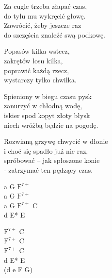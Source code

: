 \begin{text}
Za cugle trzeba złapać czas,\\
do tyłu mu wykręcić głowę.\\
Zawrócić, żeby jeszcze raz\\
do szczęścia znaleźć swą podkowę.

\vin Popasów kilka wstecz,\\
\vin zakrętów losu kilka,\\
\vin poprawić każdą rzecz,\\
\vin wystarczy tylko chwilka.

Spieniony w biegu czasu pysk\\
zanurzyć w chłodną wodę,\\
iskier spod kopyt złoty błysk\\
niech wróżbą będzie na pogodę.

Rozwianą grzywę chwycić w dłonie\\
i choć się spadło już nie raz,\\
spróbować – jak spłoszone konie\\
- zatrzymać ten pędzący czas.
\end{text}
\begin{chord}
    a G $\mathrm{F^{7+}}$\\
    a G $\mathrm{F^{7+}}$\\
    a G $\mathrm{F^{7+}}$ C\\
    d E* E

    $\mathrm{F^{7+}}$ C\\
    $\mathrm{F^{7+}}$ C\\
    $\mathrm{F^{7+}}$ C\\
    d E* E\\
    (d e F G)
\end{chord}
